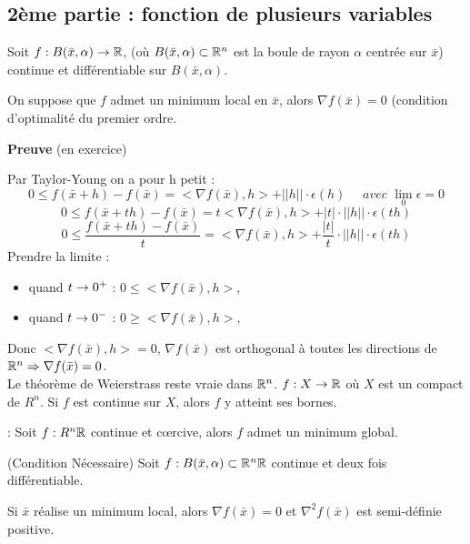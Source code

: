 		\subsection{2ème partie : fonction de plusieurs variables}
		
		\begin{theoreme}		
		Soit $f : B(\bar{x}, \alpha) \rightarrow \mathbb{R}$,  (où $B(\bar{x}, \alpha) \subset \mathbb{R}^n$ est la boule de rayon $\alpha$ centrée sur $\bar{x}$) continue et différentiable sur $B(\bar{x}, \alpha)$.
		
		On suppose que $f$ admet un minimum local en $\bar{x}$, alors $\nabla f(\bar{x}) = 0$ (condition d'optimalité du premier ordre.
		\end{theoreme}
		
		\textbf{Preuve} (en exercice)
		
		Par Taylor-Young on a pour h petit : 
		\[ 0 \leq f(\bar{x}+h)-f(\bar{x}) = < \nabla f(\bar{x}) ,h> + ||h||\cdot \epsilon(h) \quad \textit{ avec } \lim_0 \epsilon = 0\]
		\[ 0 \leq f(\bar{x}+th)-f(\bar{x}) = t< \nabla f(\bar{x}) ,h> + |t|\cdot ||h||\cdot \epsilon(th) \]
		\[ 0 \leq \frac{ f(\bar{x}+th)-f(\bar{x}) }{t} = < \nabla f(\bar{x}) ,h> + \frac{|t|}{t}\cdot ||h||\cdot \epsilon(th) \]
		Prendre la limite :
		\begin{itemize}
		\item quand $t\rightarrow 0^+$ : $0\leq <\nabla f(\bar{x}),h>$,
		\item quand $t\rightarrow 0^-$ : $0\geq <\nabla f(\bar{x}),h>$,
		\end{itemize}
		Donc $<\nabla f(\bar{x}),h>=0$, $\nabla f(\bar{x})$ est orthogonal à toutes les directions de $\mathbb{R}^n\Rightarrow \nabla f(\bar{x})=0 $.\\
		
		Le théorème de Weierstrass reste vraie dans $\mathbb{R}^n$.
		$f:X\rightarrow \mathbb{R}$ où $X$ est un compact de $R^n$.
		Si $f$ est continue sur $X$, alors $f$ y atteint ses bornes.
		
		\begin{theoreme} : 
		Soit $f:R^n \mathbb{R}$ continue et c\oe rcive, alors $f$ admet un minimum global.
		\end{theoreme}
		
		\begin{theoreme} (Condition Nécessaire)
		Soit $f : B(\bar{x}, \alpha) \subset \mathbb{R}^n \mathbb{R}$ continue et deux fois différentiable.
		
		Si $\bar{x}$ réalise un minimum local, alors $\nabla f(\bar{x}) = 0$ et $\nabla^2 f(\bar{x})$ est semi-définie positive.
		\end{theoreme}
		
